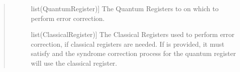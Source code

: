 \documentclass[letterpaper,10pt,english]{sphinxmanual}
\begin{document}
\begin{fulllineitems}
\begin{fulllineitems}
\begin{quote}
\begin{description}
\begin{description}
\item[{}] \leavevmode{[}list(QuantumRegister){]}
The Quantum Registers to on which to perform error correction.

\item[{}] \leavevmode{[}list(ClassicalRegister){]}
The Classical Registers used to perform error correction, if classical registers are needed. If  is provided, it must satisfy  and the syndrome correction process for the  quantum register will use the  classical register.

\end{description}

\end{description}\end{quote}

\end{fulllineitems}


\end{fulllineitems}

\end{document}
